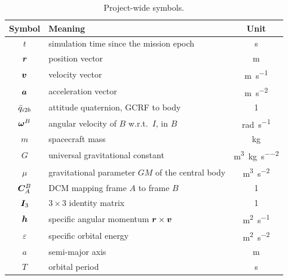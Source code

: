\begin{table}[htbp]
  \centering
  \caption{Project-wide symbols.}
  \label{tab:notation:symbols}
  \begin{tabular}{clc}
    \toprule
    Symbol & Meaning & Unit \\
    \midrule
    $t$ & simulation time since the mission epoch & \unit{\second} \\
    $\bm{r}$ & position vector & \unit{\metre} \\
    $\bm{v}$ & velocity vector & \unit{\metre\per\second} \\
    $\bm{a}$ & acceleration vector & \unit{\metre\per\second\squared} \\
    $\bar{q}_{i2b}$ & attitude quaternion, GCRF to body & 1 \\
    $\bm{\omega}^{B}$ & angular velocity of $B$ w.r.t.\ $I$, in $B$ & \unit{\radian\per\second} \\
    $m$ & spacecraft mass & \unit{\kilogram} \\
    $G$ & universal gravitational constant & \unit{\metre\cubed\per\kilogram\per\second\squared} \\
    $\mu$ & gravitational parameter $GM$ of the central body & \unit{\metre\cubed\per\second\squared} \\
    $\bm{C}_{A}^{B}$ & DCM mapping frame $A$ to frame $B$ & 1 \\
    $\bm{I}_3$ & $3 \times 3$ identity matrix & 1 \\
    $\bm{h}$ & specific angular momentum $\bm{r} \times \bm{v}$ & \unit{\metre\squared\per\second} \\
    $\varepsilon$ & specific orbital energy & \unit{\metre\squared\per\second\squared} \\
    $a$ & semi-major axis & \unit{\metre} \\
    $T$ & orbital period & \unit{\second} \\
    \bottomrule
  \end{tabular}
\end{table}
